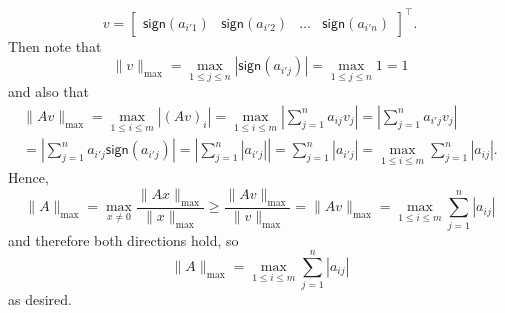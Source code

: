 \documentclass{../../../kin_math}
\begin{document}
\begin{questions}
\begin{enumerate}
\begin{solution}
      \begin{equation*}
        v = \begin{bmatrix} \textsf{sign}(a_{i'1}) & \textsf{sign}(a_{i'2}) & \dots & \textsf{sign}(a_{i'n}) \end{bmatrix}^\top.
      \end{equation*}
      Then note that
      \begin{equation*}
        \lVert v \rVert_\text{max} = \max_{1 \leq j \leq n} |\textsf{sign}(a_{i'j})| = \max_{1 \leq j \leq n} 1 = 1
      \end{equation*}
      and also that
      \begin{multline*}
        \lVert Av \rVert_\text{max} = \max_{1 \leq i \leq m} |(Av)_i| = \max_{1 \leq i \leq m} \left|\sum_{j = 1}^n a_{ij} v_j\right| = \left|\sum_{j = 1}^n a_{i'j} v_j\right| \\
        = \left|\sum_{j = 1}^n a_{i'j} \textsf{sign}(a_{i'j}) \right| = \left|\sum_{j = 1}^n |a_{i'j}| \right| = \sum_{j = 1}^n |a_{i'j}| = \max_{1 \leq i \leq m} \sum_{j = 1}^n |a_{ij}|.
      \end{multline*}
      Hence,
      \begin{equation*}
        \lVert A \rVert_\text{max} = \max_{x \neq 0} \frac{\lVert Ax \rVert_\text{max}}{\lVert x \rVert_\text{max}} \geq \frac{\lVert Av \rVert_\text{max}}{\lVert v \rVert_\text{max}} = \lVert Av \rVert_\text{max} = \max_{1 \leq i \leq m} \sum_{j = 1}^n |a_{ij}|
      \end{equation*}
      and therefore both directions hold, so
      \begin{equation*}
        \lVert A \rVert_\text{max} = \max_{1 \leq i \leq m} \sum_{j = 1}^n |a_{ij}|
      \end{equation*}
      as desired.
    \end{solution}
  \end{enumerate}
\end{questions}
\end{document}
